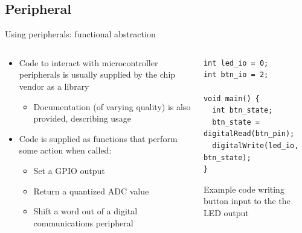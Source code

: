 \documentclass{beamer}
\begin{document}
\subsection{Peripheral}
\begin{frame}[fragile]{Using peripherals: functional abstraction}
  \begin{columns}[T]
    \begin{column}{.6\textwidth}
      \begin{itemize}
        \item Code to interact with microcontroller peripherals is usually supplied by the chip vendor as a library
        \begin{itemize}
          \item Documentation (of varying quality) is also provided, describing usage
        \end{itemize}
        \item Code is supplied as functions that perform some action when called:
        \begin{itemize}
          \item Set a GPIO output
          \item Return a quantized ADC value
          \item Shift a word out of a digital communications peripheral
        \end{itemize}        
      \end{itemize}
    \end{column}

    \begin{column}{0.4\textwidth}
\begin{lstlisting}[tabsize=2,basicstyle=\ttfamily\scriptsize]
int led_io = 0;
int btn_io = 2;

void main() {
  int btn_state;
  btn_state = digitalRead(btn_pin);
  digitalWrite(led_io, btn_state);
} \end{lstlisting} 
Example code writing button input to the the LED output
    \end{column}
  \end{columns}
\end{frame}
\end{document}
